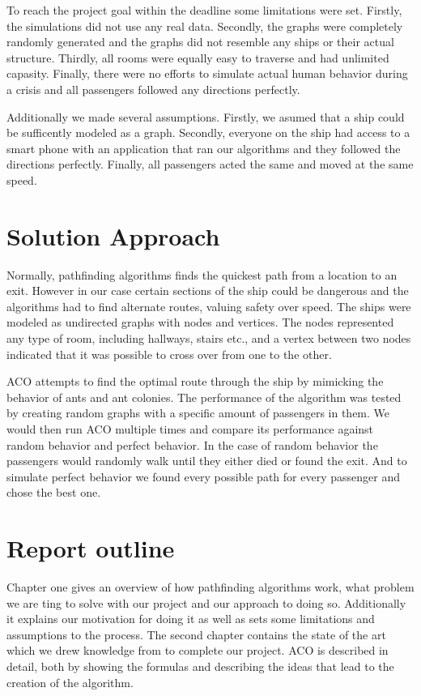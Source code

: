To reach the project goal within the deadline some limitations were set. Firstly, the simulations did not use 
any real data. Secondly, the graphs were completely randomly generated and the graphs did not resemble
any ships or their actual structure. Thirdly, all rooms were equally easy to traverse and had unlimited capasity. 
Finally, there were no efforts to simulate actual human behavior during a crisis and all passengers followed
any directions perfectly.

Additionally we made several assumptions. Firstly, we asumed that a ship could be sufficently modeled
as a graph. Secondly, everyone on the ship had access to a smart phone with an application that ran our
algorithms and they followed the directions perfectly. Finally, all passengers acted the same and moved at
the same speed.

\section{Solution Approach}

Normally, pathfinding algorithms finds the quickest path from a location to an 
exit. However in our case certain sections of the ship could be dangerous and the algorithms 
had to find alternate routes, valuing safety over speed. The ships were modeled as undirected
graphs with nodes and vertices. The nodes represented any type of room, including
hallways, stairs etc., and a vertex between two nodes indicated that it was possible to
cross over from one to the other.

ACO attempts to find the optimal route through the ship by mimicking the behavior of ants and ant colonies. 
The performance of the algorithm was tested by creating random graphs with a specific amount of
passengers in them. We would then run ACO multiple times and compare its performance against
random behavior and perfect behavior. In the case of random behavior the passengers would randomly
walk until they either died or found the exit. And to simulate perfect behavior we found every possible
path for every passenger and chose the best one.

\section{Report outline}

Chapter one gives an overview of how pathfinding algorithms work, what problem we are ting to solve with our
project and our approach to doing so. Additionally it explains our motivation for doing it as well as sets some
limitations and assumptions to the process. The second chapter contains the state of the art which we drew
knowledge from to complete our project. ACO is described in detail, both by showing the formulas and describing
the ideas that lead to the creation of the algorithm.

